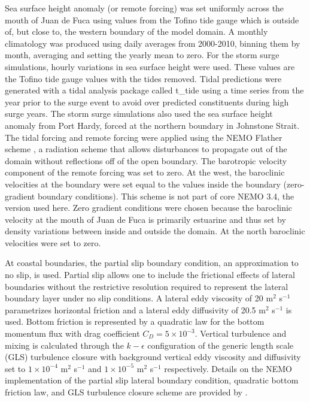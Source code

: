 \documentclass{tATO2e}
\begin{document}
Sea surface height anomaly (or remote forcing) was set uniformly across the mouth of Juan de Fuca using values from the Tofino tide gauge \citep{DFOObservations} which is outside of, but close to, the western boundary of the model domain.  A monthly climatology was produced using daily averages from 2000-2010, binning them by month, averaging and setting the yearly mean to zero.  For the storm surge simulations, hourly variations in sea surface height were used.  These values are the Tofino tide gauge values with the tides removed. Tidal predictions were generated with a tidal analysis package called t\_tide \citep{pawlowicz2002classical} using a time series from the year prior to the surge event to avoid over predicted constituents during high surge years. The storm surge simulations also used the sea surface height anomaly from Port Hardy, forced at the northern boundary in Johnstone Strait. The tidal forcing and remote forcing were applied using the NEMO Flather scheme \citep{flather1994storm, madec2012nemo}, a radiation scheme that allows disturbances to propagate out of the domain without reflections off of the open boundary. The barotropic velocity component of the remote forcing was set to zero. At the west, the baroclinic velocities at the boundary were set equal to the values inside the boundary (zero-gradient boundary conditions).  This scheme is not part of core NEMO 3.4, the version used here.  Zero gradient conditions were chosen because the baroclinic velocity at the mouth of Juan de Fuca is primarily estuarine and thus set by density variations between inside and outside the domain. At the north baroclinic velocities were set to zero. 

At coastal boundaries, the partial slip boundary condition, an approximation to no slip, is used. Partial slip allows one to include the frictional effects of lateral boundaries without the restrictive resolution required to represent the lateral boundary layer under no slip conditions. A lateral eddy viscosity of 20 m$^2$ s$^{-1}$ parametrizes horizontal friction and a lateral eddy diffusivity of 20.5 m$^2$ s$^{-1}$ is used.  Bottom friction is represented by a quadratic law for the bottom momentum flux with drag coefficient $C_D = 5\times 10^{-3}$. Vertical turbulence and mixing is calculated through the $k-\epsilon$ configuration of the generic length scale (GLS) turbulence closure \citep{umlauf2003generic} with background vertical eddy viscosity and diffusivity set to $1\times10^{-4}$ m$^2$ s$^{-1}$ and $1\times10^{-5}$ m$^2$ s$^{-1}$ respectively. Details on the NEMO implementation of the partial slip lateral boundary condition, quadratic bottom friction law, and GLS turbulence closure scheme are provided by \citet{madec2012nemo}.
\end{document}
